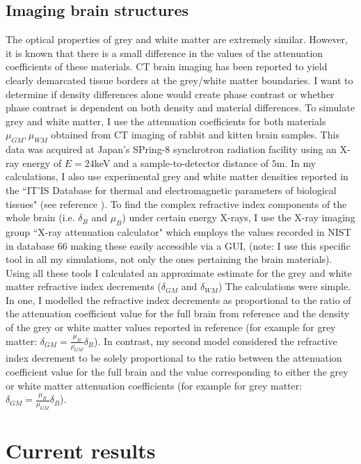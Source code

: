 \documentclass[9pt, a4paper]{article}
\begin{document}
\subsection{Imaging brain structures}
The optical properties of grey and white matter are extremely similar. However, it is known that there is a small difference in the values of the attenuation coefficients of these materials. CT brain imaging has been reported to yield clearly demarcated tissue borders at the grey/white matter boundaries\cite{Beltran2}. I want to determine if density differences alone would create phase contrast or whether phase contrast is dependent on both density and material differences.
To simulate grey and white matter, I use the attenuation coefficients for both materials $\mu_{GM},\mu_{WM}$ obtained from CT imaging of rabbit and kitten brain samples. This data was acquired at Japan's SPring-8 synchrotron radiation facility using an X-ray energy of $E = 24$keV and a sample-to-detector distance of $5$m\cite{Linda}. In my calculations, I also use experimental grey and white matter densities reported in the ``IT’IS Database for thermal and electromagnetic parameters of biological tissues" (see reference \cite{ITIS}). To find the complex refractive index components of the whole brain (i.e. $\delta_B$ and $\mu_B$) under certain energy X-rays, I use the X-ray imaging group ``X-ray attenuation calculator" which employs the values recorded in NIST in database 66\cite{NIST} making these easily accessible via a GUI, (note: I use this specific tool in all my simulations, not only the ones pertaining the brain materials). 
Using all these tools I calculated an approximate estimate for the grey and white matter refractive index decrements ($\delta_{GM}$ and $\delta_{WM}$) The calculations were simple. In one, I modelled the refractive index decrements as proportional to the ratio of the attenuation coefficient value for the full brain from reference\cite{NIST} and the density of the grey or white matter values reported in reference \cite{ITIS} (for example for grey matter: $\delta_{GM} = \frac{\mu_B}{\rho_{GM}} \delta_B$). In contrast, my second model considered the refractive index decrement to be solely proportional to the ratio between the attenuation coefficient value for the full brain and the value corresponding to either the grey or white matter attenuation coefficients (for example for grey matter: $\delta_{GM} = \frac{\mu_B}{\mu_{GM}} \delta_B$). 

\section{Current results}
\end{document}
